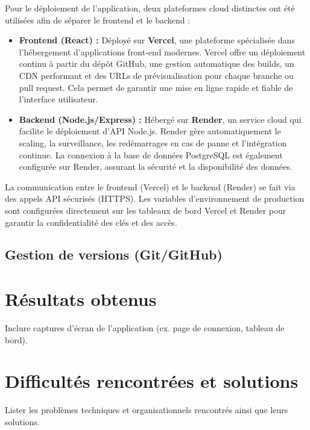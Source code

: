\documentclass[12pt,a4paper]{report}
\begin{document}
Pour le déploiement de l’application, deux plateformes cloud distinctes ont été utilisées afin de séparer le frontend et le backend :

\begin{itemize}
    \item \textbf{Frontend (React) :} Déployé sur \textbf{Vercel}, une plateforme spécialisée dans l’hébergement d’applications front-end modernes. Vercel offre un déploiement continu à partir du dépôt GitHub, une gestion automatique des builds, un CDN performant et des URLs de prévisualisation pour chaque branche ou pull request. Cela permet de garantir une mise en ligne rapide et fiable de l’interface utilisateur.
    \item \textbf{Backend (Node.js/Express) :} Hébergé sur \textbf{Render}, un service cloud qui facilite le déploiement d’API Node.js. Render gère automatiquement le scaling, la surveillance, les redémarrages en cas de panne et l’intégration continue. La connexion à la base de données PostgreSQL est également configurée sur Render, assurant la sécurité et la disponibilité des données.
\end{itemize}

La communication entre le frontend (Vercel) et le backend (Render) se fait via des appels API sécurisés (HTTPS). Les variables d’environnement de production sont configurées directement sur les tableaux de bord Vercel et Render pour garantir la confidentialité des clés et des accès.

\section{Gestion de versions (Git/GitHub)}


\chapter{Résultats obtenus}
Inclure captures d’écran de l’application (ex. page de connexion, tableau de bord).  

\chapter{Difficultés rencontrées et solutions}
Lister les problèmes techniques et organisationnels rencontrés ainsi que leurs solutions.  
\end{document}
